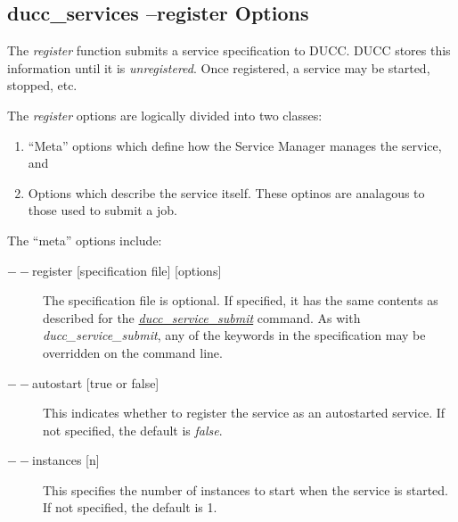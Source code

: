     \subsection{ducc\_services --register Options}
    \label{subsec:cli.ducc-services.register}
       The {\em register} function submits a service specification to DUCC.  DUCC stores this 
       information until it is {\em unregistered}.  Once registered, a service may be
       started, stopped, etc.

       The {\em register} options are logically divided into two classes:
       \begin{enumerate}
         \item ``Meta'' options which define how the Service Manager manages the service, and
         \item Options which describe the service itself.  These optinos are analagous to
           those used to submit a job.
       \end{enumerate}

       The ``meta'' options include:
       \begin{description}
           \item[$--$register {[specification file] [options]}] The specification file is optional.  If
             specified, it has the same contents as described for the \hyperref[sec:cli.service-submit]{{\em
                 ducc\_service\_submit}} command.  As with {\em ducc\_service\_submit}, any of the
             keywords in the specification may be overridden on the command line.

           \item[$--$autostart {[true or false]}] This indicates whether to register the service as
             an autostarted service.  If not specified, the default is {\em false}.
             
           \item[$--$instances {[n]}] This specifies the number of instances to start when the service
             is started.  If not specified, the default is 1.
                         
       \end{description}

